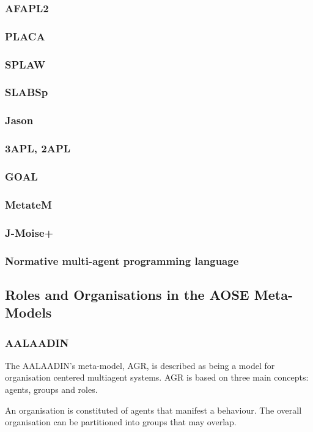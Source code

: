 \documentclass{article}
\begin{document}
\subsubsection{AFAPL2}
\subsubsection{PLACA}
\subsubsection{SPLAW}
\subsubsection{SLABSp}
\subsubsection{Jason}
\subsubsection{3APL, 2APL}
\subsubsection{GOAL}
\subsubsection{MetateM}
\subsubsection{J-Moise+}
\subsubsection{Normative multi-agent programming language}

\subsection{Roles and Organisations in the AOSE Meta-Models}

\subsubsection{AALAADIN} The AALAADIN's meta-model, AGR, is described
as being a model for organisation centered multiagent systems. AGR is
based on three main concepts: agents, groups and roles.

An organisation is constituted of agents that manifest a behaviour.
The overall organisation can be partitioned into groups that may
overlap. 
\end{document}
